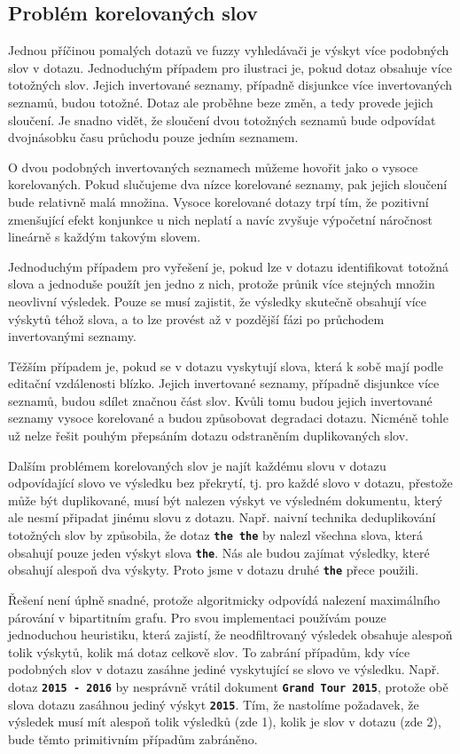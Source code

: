 \documentclass[11pt,letterpaper,oneside,openright]{book}
\newcommand{\bftt}[1]{\texttt{\textbf{#1}}}
\begin{document}
\subsection{Problém korelovaných slov}
Jednou příčinou pomalých dotazů ve fuzzy vyhledávači je výskyt více podobných
slov v dotazu. Jednoduchým případem pro ilustraci je, pokud dotaz obsahuje více
totožných slov. Jejich invertované seznamy, případně disjunkce více
invertovaných seznamů, budou totožné. Dotaz ale proběhne beze změn, a tedy
provede jejich sloučení. Je snadno vidět, že sloučení dvou totožných seznamů
bude odpovídat dvojnásobku času průchodu pouze jedním seznamem.

O dvou podobných invertovaných seznamech můžeme hovořit jako o vysoce
korelovaných. Pokud slučujeme dva nízce korelované seznamy, pak jejich sloučení
bude relativně malá množina. Vysoce korelované dotazy trpí tím, že pozitivní
zmenšující efekt konjunkce u nich neplatí a navíc zvyšuje výpočetní náročnost
lineárně s každým takovým slovem.

Jednoduchým případem pro vyřešení je, pokud lze v dotazu identifikovat totožná
slova a jednoduše použít jen jedno z nich, protože průnik více stejných množin
neovlivní výsledek. Pouze se musí zajistit, že výsledky skutečně obsahují více
výskytů téhož slova, a to lze provést až v pozdější fázi po průchodem
invertovanými seznamy.

Těžším případem je, pokud se v dotazu vyskytují slova, která k sobě mají podle
editační vzdálenosti blízko. Jejich invertované seznamy, případně disjunkce
více seznamů, budou sdílet značnou část slov. Kvůli tomu budou jejich
invertované seznamy vysoce korelované a budou způsobovat degradaci dotazu.
Nicméně tohle už nelze řešit pouhým přepsáním dotazu odstraněním duplikovaných
slov.

Dalším problémem korelovaných slov je najít každému slovu v dotazu odpovídající
slovo ve výsledku bez překrytí, tj. pro každé slovo v dotazu, přestože může být
duplikované, musí být nalezen výskyt ve výsledném dokumentu, který ale nesmí
připadat jinému slovu z dotazu. Např. naivní technika deduplikování totožných
slov by způsobila, že dotaz \bftt{the the} by nalezl všechna slova, která
obsahují pouze jeden výskyt slova \bftt{the}. Nás ale budou zajímat výsledky,
které obsahují alespoň dva výskyty. Proto jsme v dotazu druhé \bftt{the} přece
použili.

Řešení není úplně snadné, protože algoritmicky odpovídá nalezení maximálního
párování v bipartitním grafu. Pro svou implementaci používám pouze jednoduchou
heuristiku, která zajistí, že neodfiltrovaný výsledek obsahuje alespoň tolik
výskytů, kolik má dotaz celkově slov. To zabrání případům, kdy více podobných
slov v dotazu zasáhne jediné vyskytující se slovo ve výsledku. Např. dotaz
\bftt{2015 - 2016} by nesprávně vrátil dokument \bftt{Grand Tour 2015}, protože
obě slova dotazu zasáhnou jediný výskyt \bftt{2015}. Tím, že nastolíme
požadavek, že výsledek musí mít alespoň tolik výsledků (zde 1), kolik je slov v
dotazu (zde 2), bude těmto primitivním případům zabráněno.
\end{document}
